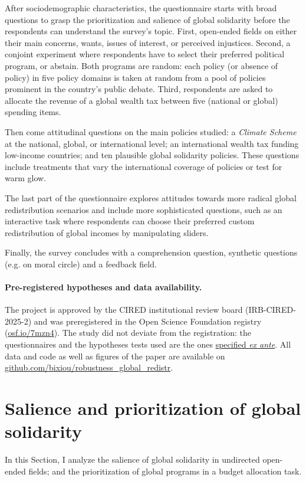 \documentclass[12pt,english]{article}
\begin{document}
\begin{bibunit}
After sociodemographic characteristics, the questionnaire starts with broad questions to grasp the prioritization and salience of global solidarity before the respondents can understand the survey's topic. First, open-ended fields on either their main concerns, wants, issues of interest, or perceived injustices. Second, a conjoint experiment where respondents have to select their preferred political program, or abstain. Both programs are random: each policy (or absence of policy) in five policy domains is taken at random from a pool of policies prominent in the country's public debate. Third, respondents are asked to allocate the revenue of a global wealth tax between five (national or global) spending items. 

Then come attitudinal questions on the main policies studied: a \textit{Climate Scheme} at the national, global, or international level; an international wealth tax funding low-income countries; and ten plausible global solidarity policies. These questions include treatments that vary the international coverage of policies or test for warm glow. 

The last part of the questionnaire explores attitudes towards more radical global redistribution scenarios and include more sophisticated questions, such as an interactive task where respondents can choose their preferred custom redistribution of global incomes by manipulating sliders. 

Finally, the survey concludes with a comprehension question, synthetic questions (e.g. on moral circle) and a feedback field.

\paragraph{Pre-registered hypotheses and data availability.}
The project is approved by the CIRED institutional review board (IRB-CIRED-2025-2) and %
was preregistered in the Open Science Foundation registry (\href{https://osf.io/7mzn4}{osf.io/7mzn4}). The study did not deviate from the registration: the questionnaires and the hypotheses tests used are the ones \href{https://osf.io/j5scn}{specified \textit{ex ante}}. All data and code as well as figures of the paper are available on \href{https://github.com/bixiou/robustness_global_redistr}{github.com/bixiou/robustness\_global\_redistr}. 


\section{Salience and prioritization of global solidarity\label{sec:salience}}
In this Section, I analyze the salience of global solidarity in undirected open-ended fields; and the prioritization of global programs in a budget allocation task.


\end{bibunit}
\end{document}
